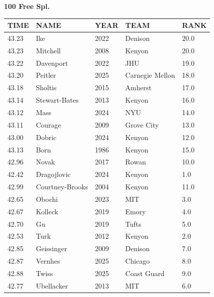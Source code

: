 \begin{table}[H]
\centering
\begin{minipage}[t]{0.6\textwidth}
\centering
\textbf{100 Free Spl.}\\[0.1cm]
\begin{tabular}{@{}p{1.8cm}p{2.8cm}p{1.2cm}p{1.4cm}p{0.8cm}@{}}
\hline
    \textbf{TIME} & \textbf{NAME} & \textbf{YEAR} & \textbf{TEAM} & \textbf{RANK} \\
\hline
    43.23 & Ike & 2022 & Denison & 20.0 \\
    43.23 & Mitchell & 2008 & Kenyon & 20.0 \\
    43.22 & Davenport & 2022 & JHU & 19.0 \\
    43.20 & Peitler & 2025 & Carnegie Mellon & 18.0 \\
    43.18 & Sholtis & 2015 & Amherst & 17.0 \\
    43.14 & Stewart-Bates & 2013 & Kenyon & 16.0 \\
    43.12 & Mass & 2024 & NYU & 14.0 \\
    43.11 & Courage & 2009 & Grove City & 13.0 \\
    43.00 & Dobric & 2024 & Kenyon & 12.0 \\
    43.13 & Born & 1986 & Kenyon & 15.0 \\
    42.96 & Novak & 2017 & Rowan & 10.0 \\
    42.42 & Dragojlovic & 2024 & Kenyon & 1.0 \\
    42.99 & Courtney-Brooks & 2004 & Kenyon & 11.0 \\
    42.65 & Obochi & 2023 & MIT & 3.0 \\
    42.67 & Kolleck & 2019 & Emory & 4.0 \\
    42.70 & Gu & 2019 & Tufts & 5.0 \\
    42.53 & Turk & 2012 & Kenyon & 2.0 \\
    42.85 & Geissinger & 2009 & Denison & 7.0 \\
    42.87 & Vernhes & 2025 & Chicago & 8.0 \\
    42.88 & Twiss & 2025 & Coast Guard & 9.0 \\
    42.77 & Ubellacker & 2013 & MIT & 6.0 \\
\hline
\end{tabular}
\end{minipage}
\end{table}

